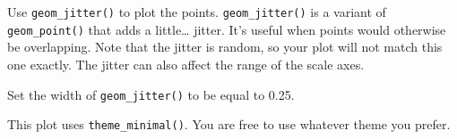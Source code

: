 \documentclass[
]{book}
\begin{document}
Use \texttt{geom\_jitter()} to plot the points. \texttt{geom\_jitter()} is a variant of \texttt{geom\_point()} that adds a little\ldots{} jitter. It's useful when points would otherwise be overlapping. Note that the jitter is random, so your plot will not match this one exactly. The jitter can also affect the range of the scale axes.

Set the width of \texttt{geom\_jitter()} to be equal to 0.25.

This plot uses \texttt{theme\_minimal()}. You are free to use whatever theme you prefer.

  
\end{document}
